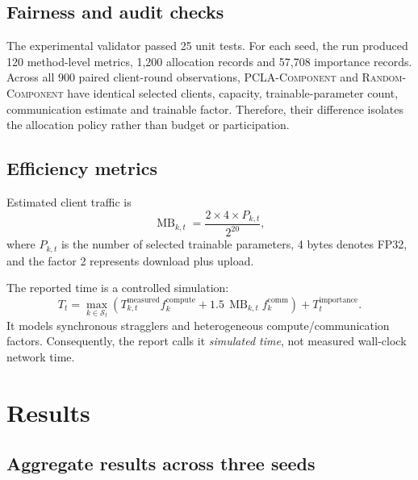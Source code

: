 \documentclass[11pt,a4paper]{article}
\newcommand{\method}{\textsc{PCLA-Component}}
\newcommand{\randomcomp}{\textsc{Random-Component}}
\begin{document}
\subsection{Fairness and audit checks}

The experimental validator passed 25 unit tests. For each seed, the run
produced 120 method-level metrics, 1,200 allocation records and 57,708
importance records. Across all 900 paired client-round observations,
\method{} and \randomcomp{} have identical selected clients, capacity,
trainable-parameter count, communication estimate and trainable factor.
Therefore, their difference isolates the allocation policy rather than budget
or participation.

\subsection{Efficiency metrics}

Estimated client traffic is
\begin{equation}
  \operatorname{MB}_{k,t} =
  \frac{2\times 4\times P_{k,t}}{2^{20}},
  \label{eq:comm}
\end{equation}
where $P_{k,t}$ is the number of selected trainable parameters, 4 bytes denotes
FP32, and the factor 2 represents download plus upload.

The reported time is a controlled simulation:
\begin{equation}
 T_t =
 \max_{k\in\mathcal{S}_t}
 \left(
 T^{\mathrm{measured}}_{k,t}f^{\mathrm{compute}}_k+
 1.5\,\operatorname{MB}_{k,t}f^{\mathrm{comm}}_k
 \right)
 +T^{\mathrm{importance}}_t .
 \label{eq:time}
\end{equation}
It models synchronous stragglers and heterogeneous compute/communication
factors. Consequently, the report calls it \emph{simulated time}, not measured
wall-clock network time.

\section{Results}

\subsection{Aggregate results across three seeds}
\end{document}
